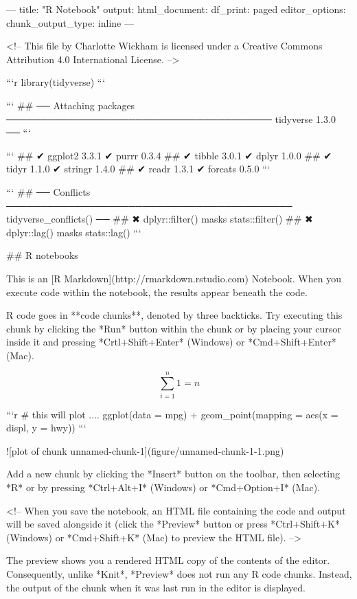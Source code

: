 ---
title: "R Notebook"
output:
  html_document:
    df_print: paged
editor_options:
  chunk_output_type: inline
---

<!-- This file by Charlotte Wickham is licensed under a Creative Commons Attribution 4.0 International License. -->


```r
library(tidyverse)
```

```
## ── Attaching packages ─────────────────────────────────────── tidyverse 1.3.0 ──
```

```
## ✔ ggplot2 3.3.1     ✔ purrr   0.3.4
## ✔ tibble  3.0.1     ✔ dplyr   1.0.0
## ✔ tidyr   1.1.0     ✔ stringr 1.4.0
## ✔ readr   1.3.1     ✔ forcats 0.5.0
```

```
## ── Conflicts ────────────────────────────────────────── tidyverse_conflicts() ──
## ✖ dplyr::filter() masks stats::filter()
## ✖ dplyr::lag()    masks stats::lag()
```

## R notebooks

This is an [R Markdown](http://rmarkdown.rstudio.com) Notebook. When you execute code within the notebook, the results appear beneath the code. 

R code goes in **code chunks**, denoted by three backticks. Try executing this chunk by clicking the *Run* button within the chunk or by placing your cursor inside it and pressing *Crtl+Shift+Enter* (Windows) or *Cmd+Shift+Enter* (Mac). 


$$ \sum_{i=1}^n 1 = n$$


```r
# this will plot ....
ggplot(data = mpg) +
  geom_point(mapping = aes(x = displ, y = hwy))
```

![plot of chunk unnamed-chunk-1](figure/unnamed-chunk-1-1.png)


Add a new chunk by clicking the *Insert* button on the toolbar, then selecting *R* or by pressing  *Ctrl+Alt+I* (Windows) or *Cmd+Option+I* (Mac).



<!--
When you save the notebook, an HTML file containing the code and output will be saved alongside it (click the *Preview* button or press *Ctrl+Shift+K* (Windows) or *Cmd+Shift+K* (Mac) to preview the HTML file). 
-->


The preview shows you a rendered HTML copy of the contents of the editor. Consequently, unlike *Knit*, *Preview* does not run any R code chunks. Instead, the output of the chunk when it was last run in the editor is displayed.
